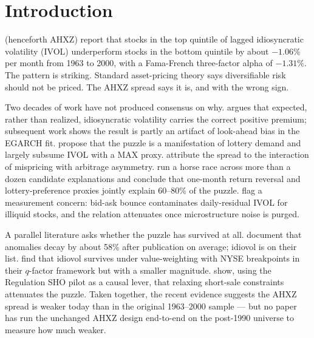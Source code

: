 \documentclass[12pt]{article}
\newcommand{\1}[1]{\mathds{1}\left[#1\right]}
\begin{document}
\newpage
\setcounter{page}{1}

\section{Introduction}\label{sec:introduction}

\citet{ang2006cross} (henceforth AHXZ) report that stocks in the top quintile
of lagged idiosyncratic volatility (IVOL) underperform stocks in the bottom
quintile by about $-1.06\%$ per month from 1963 to 2000, with a Fama-French
three-factor alpha of $-1.31\%$. The pattern is striking. Standard
asset-pricing theory says diversifiable risk should not be priced. The AHXZ
spread says it is, and with the wrong sign.

Two decades of work have not produced consensus on why. \citet{fu2009idiosyncratic}
argues that expected, rather than realized, idiosyncratic volatility carries the
correct positive premium; subsequent work shows the result is partly an artifact
of look-ahead bias in the EGARCH fit. \citet{bali2011maxing} propose that the
puzzle is a manifestation of lottery demand and largely subsume IVOL with a MAX
proxy. \citet{stambaugh2015arbitrage} attribute the spread to the interaction of
mispricing with arbitrage asymmetry. \citet{hou2016have} run a horse race across
more than a dozen candidate explanations and conclude that one-month return
reversal and lottery-preference proxies jointly explain 60--80\% of the puzzle.
\citet{han2011investor} flag a measurement concern: bid-ask bounce contaminates
daily-residual IVOL for illiquid stocks, and the relation attenuates once
microstructure noise is purged.

A parallel literature asks whether the puzzle has survived at all.
\citet{mclean2016does} document that anomalies decay by about 58\% after
publication on average; idiovol is on their list. \citet{hou2020replicating}
find that idiovol survives under value-weighting with NYSE breakpoints in their
$q$-factor framework but with a smaller magnitude. \citet{chu2020idiosyncratic}
show, using the Regulation SHO pilot as a causal lever, that relaxing short-sale
constraints attenuates the puzzle. Taken together, the recent evidence suggests
the AHXZ spread is weaker today than in the original 1963--2000 sample --- but
no paper has run the unchanged AHXZ design end-to-end on the post-1990 universe
to measure how much weaker.
\end{document}
